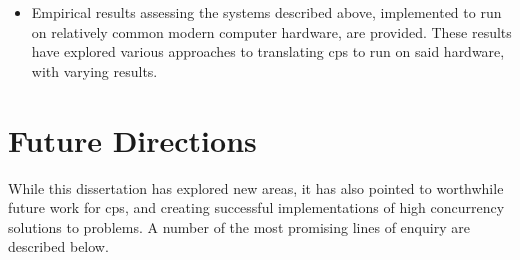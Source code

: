 \begin{itemize}
    \item Empirical results assessing the systems described above, implemented to run on relatively common modern computer hardware, are provided.  These results have explored various approaches to translating \gls{cps} to run on said hardware, with varying results.
\end{itemize}

\section{Future Directions}

While this dissertation has explored new areas, it has also pointed to worthwhile future work for \gls{cps}, and creating successful implementations of high concurrency solutions to problems.  A number of the most promising lines of enquiry are described below.





